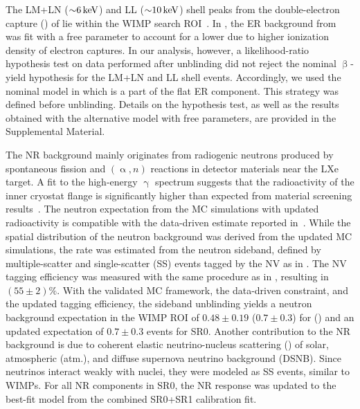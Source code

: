 \documentclass[
    reprint,
    superscriptaddress,
    aps, prl,
    amsmath,amssymb,
    twocolumn,
    showkeys,
    floatfix,
    nofootinbib,
]{revtex4-2}
\begin{document}
The LM+LN ($\SI{\sim 6}{\kilo\electronvolt}$) and LL ($\SI{\sim 10}{\kilo\electronvolt}$) shell peaks from the double-electron capture (\dec) of  lie within the WIMP search ROI~\cite{XENON:2022evz}.
In \cite{LZ:2025_wimp}, the ER background from \dec was fit with a free \chargeyield parameter to account for a lower \chargeyield due to higher ionization density of electron captures.
In our analysis, however, a likelihood-ratio hypothesis test on \srone data performed after unblinding did not reject the nominal $\upbeta$-yield hypothesis for the LM+LN and LL shell \dec events.
Accordingly, we used the nominal model in which \dec is a part of the flat ER component. %
This strategy was defined before unblinding.
Details on the hypothesis test, as well as the results obtained with the alternative model with free \dec \chargeyield parameters, are provided in the Supplemental Material.

The NR background mainly originates from radiogenic neutrons produced by spontaneous fission and $(\upalpha, n)$ reactions in detector materials near the LXe target.
A fit to the high-energy $\upgamma$ spectrum suggests that the radioactivity of the inner cryostat flange is significantly higher than expected from material screening results~\cite{XENON:2021radiopurity}.
The neutron expectation from the MC simulations with updated radioactivity is compatible with the data-driven estimate reported in~\cite{XENON:2023wimp}.
While the spatial distribution of the neutron background was derived from the updated MC simulations, the rate was estimated from the neutron sideband, defined by multiple-scatter and single-scatter (SS) events tagged by the NV as in \cite{XENON:2024ap2, XENON:2024neutron_veto}.
The NV tagging efficiency was measured with the same procedure as in \cite{XENON:2024neutron_veto}, resulting in $(55 \pm 2)\%$.
With the validated MC framework, the data-driven constraint, and the updated tagging efficiency, the sideband unblinding yields a neutron background expectation in the WIMP ROI of $0.48 \pm 0.19$ ($0.7 \pm 0.3$) for \sronea (\sroneb) and an updated expectation of $0.7 \pm 0.3$ events for SR0.
Another contribution to the NR background is due to coherent elastic neutrino-nucleus scattering (\cevns) of  solar, atmospheric (atm.), and diffuse supernova neutrino background (DSNB).
Since neutrinos interact weakly with nuclei, they were modeled as SS events, similar to WIMPs.
For all NR components in SR0, the NR response was updated to the best-fit model from the combined SR0+SR1 calibration fit.
\end{document}
